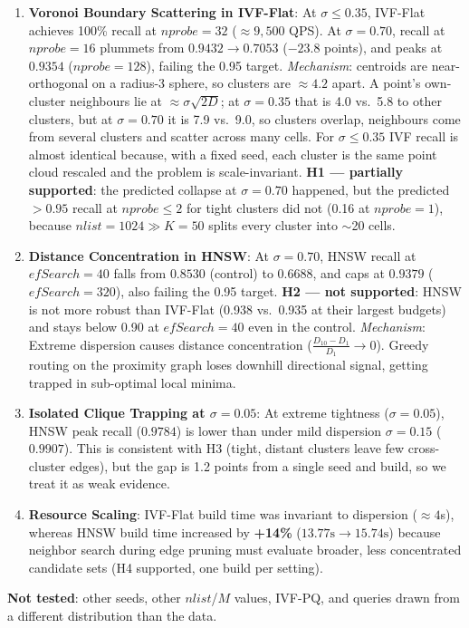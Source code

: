 \documentclass[10pt,twocolumn,a4paper]{article}
\begin{document}
\begin{enumerate}
    \item \textbf{Voronoi Boundary Scattering in IVF-Flat}: At $\sigma \le 0.35$, IVF-Flat achieves 100\% recall at $nprobe=32$ ($\approx 9{,}500$ QPS). At $\sigma=0.70$, recall at $nprobe=16$ plummets from $0.9432 \to \mathbf{0.7053}$ ($-23.8$ points), and peaks at $0.9354$ ($nprobe=128$), failing the 0.95 target. \textit{Mechanism}: centroids are near-orthogonal on a radius-3 sphere, so clusters are $\approx 4.2$ apart. A point's own-cluster neighbours lie at $\approx \sigma\sqrt{2D}$; at $\sigma=0.35$ that is 4.0 vs.\ 5.8 to other clusters, but at $\sigma=0.70$ it is 7.9 vs.\ 9.0, so clusters overlap, neighbours come from several clusters and scatter across many cells. For $\sigma \le 0.35$ IVF recall is almost identical because, with a fixed seed, each cluster is the same point cloud rescaled and the problem is scale-invariant. \textbf{H1 --- partially supported}: the predicted collapse at $\sigma=0.70$ happened, but the predicted $>0.95$ recall at $nprobe \le 2$ for tight clusters did not (0.16 at $nprobe=1$), because $nlist=1024 \gg K=50$ splits every cluster into $\sim$20 cells.
    \item \textbf{Distance Concentration in HNSW}: At $\sigma=0.70$, HNSW recall at $efSearch=40$ falls from $0.8530$ (control) to $\mathbf{0.6688}$, and caps at $0.9379$ ($efSearch=320$), also failing the 0.95 target. \textbf{H2 --- not supported}: HNSW is not more robust than IVF-Flat (0.938 vs.\ 0.935 at their largest budgets) and stays below 0.90 at $efSearch=40$ even in the control. \textit{Mechanism}: Extreme dispersion causes distance concentration ($\frac{D_{10}-D_1}{D_1} \to 0$). Greedy routing on the proximity graph loses downhill directional signal, getting trapped in sub-optimal local minima.
    \item \textbf{Isolated Clique Trapping at $\sigma=0.05$}: At extreme tightness ($\sigma=0.05$), HNSW peak recall ($0.9784$) is lower than under mild dispersion $\sigma=0.15$ ($0.9907$). This is consistent with H3 (tight, distant clusters leave few cross-cluster edges), but the gap is 1.2 points from a single seed and build, so we treat it as weak evidence.
    \item \textbf{Resource Scaling}: IVF-Flat build time was invariant to dispersion ($\approx 4$s), whereas HNSW build time increased by \textbf{+14\%} ($13.77\text{s} \to 15.74\text{s}$) because neighbor search during edge pruning must evaluate broader, less concentrated candidate sets (H4 supported, one build per setting).
\end{enumerate}
\textbf{Not tested}: other seeds, other $nlist$/$M$ values, IVF-PQ, and queries drawn from a different distribution than the data.
\end{document}
